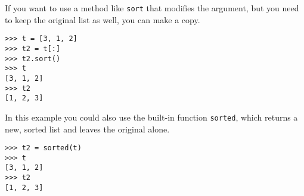 \begin{enumerate}
If you want to use a method like {\tt sort} that modifies
the argument, but you need to keep the original list as
well, you can make a copy.

\begin{lstlisting}
>>> t = [3, 1, 2]
>>> t2 = t[:]
>>> t2.sort()
>>> t
[3, 1, 2]
>>> t2
[1, 2, 3]
\end{lstlisting}

In this example you could also use the built-in function {\tt sorted},
which returns a new, sorted list and leaves the original alone.

\begin{lstlisting}
>>> t2 = sorted(t)
>>> t
[3, 1, 2]
>>> t2
[1, 2, 3]
\end{lstlisting}

\end{enumerate}


